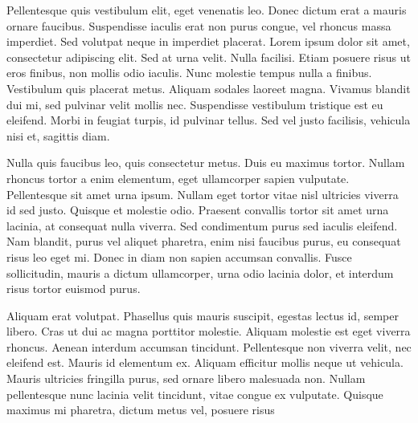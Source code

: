 Pellentesque quis vestibulum elit, eget venenatis leo. 
Donec dictum erat a mauris ornare faucibus. 
Suspendisse iaculis erat non purus congue, vel rhoncus massa imperdiet. 
Sed volutpat neque in imperdiet placerat. Lorem ipsum dolor sit amet, consectetur adipiscing elit. 
Sed at urna velit. 
Nulla facilisi. 
Etiam posuere risus ut eros finibus, non mollis odio iaculis. 
Nunc molestie tempus nulla a finibus. Vestibulum quis placerat metus. 
Aliquam sodales laoreet magna. 
Vivamus blandit dui mi, sed pulvinar velit mollis nec. 
Suspendisse vestibulum tristique est eu eleifend. 
Morbi in feugiat turpis, id pulvinar tellus. 
Sed vel justo facilisis, vehicula nisi et, sagittis diam.

Nulla quis faucibus leo, quis consectetur metus. 
Duis eu maximus tortor. 
Nullam rhoncus tortor a enim elementum, eget ullamcorper sapien vulputate. 
Pellentesque sit amet urna ipsum. 
Nullam eget tortor vitae nisl ultricies viverra id sed justo. 
Quisque et molestie odio. 
Praesent convallis tortor sit amet urna lacinia, at consequat nulla viverra. 
Sed condimentum purus sed iaculis eleifend. 
Nam blandit, purus vel aliquet pharetra, enim nisi faucibus purus, eu consequat risus leo eget mi. 
Donec in diam non sapien accumsan convallis. 
Fusce sollicitudin, mauris a dictum ullamcorper, urna odio lacinia dolor, et interdum risus tortor euismod purus.

Aliquam erat volutpat.
Phasellus quis mauris suscipit, egestas lectus id, semper libero.
Cras ut dui ac magna porttitor molestie.
Aliquam molestie est eget viverra rhoncus.
Aenean interdum accumsan tincidunt.
Pellentesque non viverra velit, nec eleifend est.
Mauris id elementum ex.
Aliquam efficitur mollis neque ut vehicula.
Mauris ultricies fringilla purus, sed ornare libero malesuada non.
Nullam pellentesque nunc lacinia velit tincidunt, vitae congue ex vulputate.
Quisque maximus mi pharetra, dictum metus vel, posuere risus
